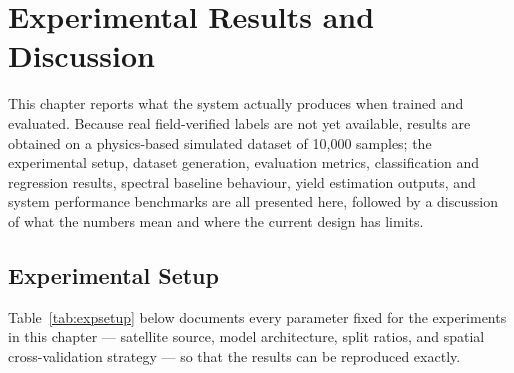 \documentclass[12pt,a4paper,oneside]{report}
\begin{document}
\chapter{Experimental Results and Discussion}

This chapter reports what the system actually produces when trained and evaluated. Because real field-verified labels are not yet available, results are obtained on a physics-based simulated dataset of 10,000 samples; the experimental setup, dataset generation, evaluation metrics, classification and regression results, spectral baseline behaviour, yield estimation outputs, and system performance benchmarks are all presented here, followed by a discussion of what the numbers mean and where the current design has limits.

\section{Experimental Setup}
\label{sec:expsetup}

Table~\ref{tab:expsetup} below documents every parameter fixed for the experiments in this chapter — satellite source, model architecture, split ratios, and spatial cross-validation strategy — so that the results can be reproduced exactly.
\end{document}
